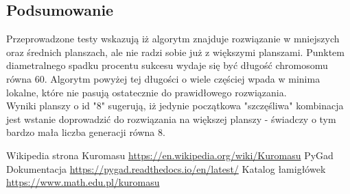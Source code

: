 \documentclass{article}
\begin{document}
\begin{center}
\end{center}

\subsection{Podsumowanie}
Przeprowadzone testy wskazują iż algorytm znajduje rozwiązanie w mniejszych oraz średnich planszach, ale nie radzi sobie już z większymi planszami. Punktem diametralnego spadku procentu sukcesu wydaje się być długość chromosomu równa 60. Algorytm powyżej tej długości o wiele częściej wpada w minima lokalne, które nie pasują ostatecznie do prawidłowego rozwiązania.\\
Wyniki planszy o id "8" sugerują, iż jedynie początkowa "szczęśliwa" kombinacja jest wstanie doprowadzić do rozwiązania na większej planszy - świadczy o tym bardzo mała liczba generacji równa 8.

\begin{thebibliography}{9}
 Wikipedia strona Kuromasu \url{https://en.wikipedia.org/wiki/Kuromasu}
 PyGad Dokumentacja  \url{https://pygad.readthedocs.io/en/latest/}
 Katalog łamigłówek \url{https://www.math.edu.pl/kuromasu}
\end{thebibliography}
\end{document}
